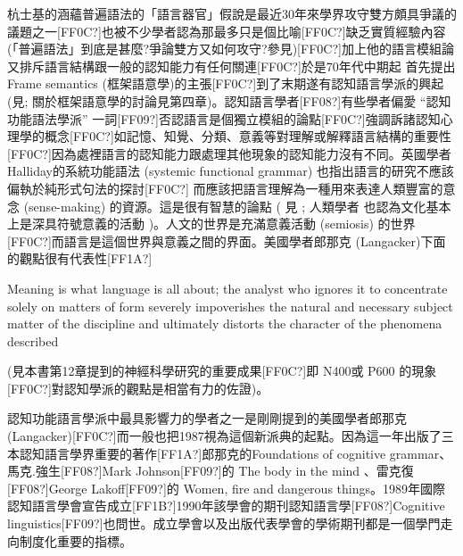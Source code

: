 杭士基的涵蘊普遍語法的「語言器官」假說是最近30年來學界攻守雙方頗具爭議的議題之一[FF0C?]也被不少學者認為那最多只是個比喻[FF0C?]缺乏實質經驗內容 (「普遍語法」到底是甚麼?爭論雙方又如何攻守?參見\citealt{EvansLevinson2009})[FF0C?]加上他的語言模組論又排斥語言結構跟一般的認知能力有任何關連[FF0C?]於是70年代中期起 \citet{Fillmore1976} 首先提出 Frame semantics (框架語意學)的主張[FF0C?]到了末期遂有認知語言學派的興起 (見\citealt{Behme2014}; 關於框架語意學的討論見第四章)。認知語言學者[FF08?]有些學者偏愛 “認知功能語法學派” 一詞[FF09?]否認語言是個獨立模組的論點[FF0C?]強調訴諸認知心理學的概念[FF0C?]如記憶、知覺、分類、意義等對理解或解釋語言結構的重要性[FF0C?]因為處裡語言的認知能力跟處理其他現象的認知能力沒有不同。英國學者 Halliday的系統功能語法 (systemic functional grammar) 也指出語言的研究不應該偏執於純形式句法的探討[FF0C?] 而應該把語言理解為一種用來表達人類豐富的意念 (sense-making) 的資源。這是很有智慧的論點 ( 見 \citealt{HallidayMatthiessen2004}; 人類學者 \citet{Geertz1983} 也認為文化基本上是深具符號意義的活動 )。人文的世界是充滿意義活動 (semiosis) 的世界 [FF0C?]而語言是這個世界與意義之間的界面。美國學者郎那克 (Langacker)下面的觀點很有代表性[FF1A?]

Meaning is what language is all about; the analyst who ignores it to concentrate solely on matters of form severely impoverishes the natural and necessary subject matter of the discipline and ultimately distorts the character of the phenomena described \citep[12]{Langacker1987}

(見本書第12章提到的神經科學研究的重要成果[FF0C?]即 N400或 P600 的現象[FF0C?]對認知學派的觀點是相當有力的佐證)。

認知功能語言學派中最具影響力的學者之一是剛剛提到的美國學者郎那克   (Langacker)[FF0C?]而一般也把1987視為這個新派典的起點。因為這一年出版了三本認知語言學界重要的著作[FF1A?]郎那克的Foundations of cognitive grammar、馬克.強生[FF08?]Mark Johnson[FF09?]的 The body in the mind 、雷克復[FF08?]George Lakoff[FF09?]的 Women, fire and dangerous things。1989年國際認知語言學會宣告成立[FF1B?]1990年該學會的期刊認知語言學[FF08?]Cognitive linguistics[FF09?]也問世。成立學會以及出版代表學會的學術期刊都是一個學門走向制度化重要的指標。


